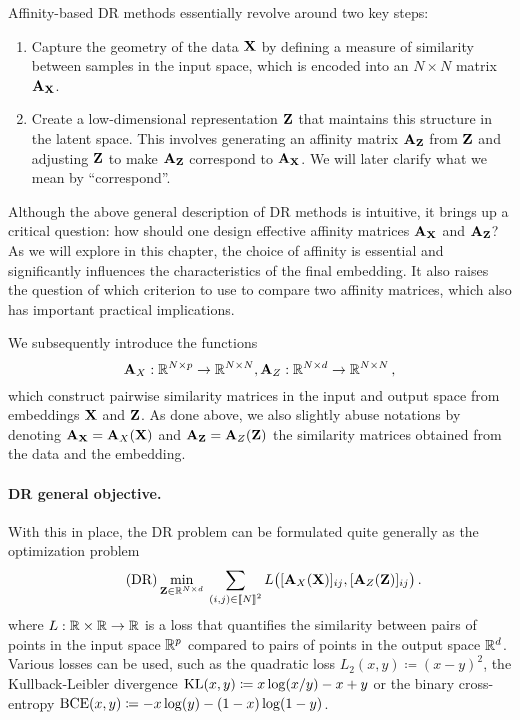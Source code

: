 Affinity-based DR methods essentially revolve around two key steps:

\begin{enumerate}
    \item Capture the geometry of the data ${\mathbf{X}}$ by defining a measure of similarity between samples in the input space, which is encoded into an $N \times N$ matrix ${\mathbf{A}}_{{\mathbf{X}}}$.
    \item Create a low-dimensional representation ${\mathbf{Z}}$ that maintains this structure in the latent space. This involves generating an affinity matrix ${\mathbf{A}}_{{\mathbf{Z}}}$ from ${\mathbf{Z}}$ and adjusting ${\mathbf{Z}}$ to make ${\mathbf{A}}_{{\mathbf{Z}}}$ correspond to ${\mathbf{A}}_{{\mathbf{X}}}$. We will later clarify what we mean by ``correspond''.
\end{enumerate}

Although the above general description of DR methods is intuitive, it brings up a critical question: how should one design effective affinity matrices ${\mathbf{A}}_{{\mathbf{X}}}$ and ${\mathbf{A}}_{{\mathbf{Z}}}$? As we will explore in this chapter, the choice of affinity is essential and significantly influences the characteristics of the final embedding. It also raises the question of which criterion to use to compare two affinity matrices, which also has important practical implications.

We subsequently introduce the functions
\begin{equation}
\label{eq:sim_function}
{\mathbf{A}}_{X}: \mathbb{R}^{N \times p} \to \mathbb{R}^{N \times N}, {\mathbf{A}}_{Z}: \mathbb{R}^{N \times d} \to \mathbb{R}^{N \times N}\,,
\end{equation}
which construct pairwise similarity matrices in the input and output space from embeddings ${\mathbf{X}}$ and ${\mathbf{Z}}$. As done above, we also slightly abuse notations by denoting ${\mathbf{A}}_{\mathbf{X}} = {\mathbf{A}}_{X}({\mathbf{X}})$ and ${\mathbf{A}}_{\mathbf{Z}} = {\mathbf{A}}_{Z}({\mathbf{Z}})$ the similarity matrices obtained from the data and the embedding.
 
\paragraph{DR general objective.} With this in place, the DR problem can be formulated quite generally as the optimization problem
\begin{equation}
\label{eq:DR_criterion}\tag{DR}
\min_{\mZ \in \R^{N \times d}} \: \sum_{(i,j) \in \integ{N}^2}  L\big([\simiX(\mX)]_{ij}, [\simi(\mZ)]_{ij}\big) \,. %
\end{equation}
where $L:\mathbb{R} \times \mathbb{R} \rightarrow \mathbb{R}$ is a loss that quantifies the similarity between pairs of points in the input space $\mathbb{R}^{p}$ compared to pairs of points in the output space $\mathbb{R}^{d}$. Various losses can be used, such as the quadratic loss $L_2(x,y) \coloneqq (x - y)^2$, the Kullback-Leibler divergence $\operatorname{KL}(x,y) \coloneqq x \log (x/y) - x +y$ or the binary cross-entropy $\operatorname{BCE}(x,y) \coloneqq -x \log(y) - (1-x) \log(1-y)$.

